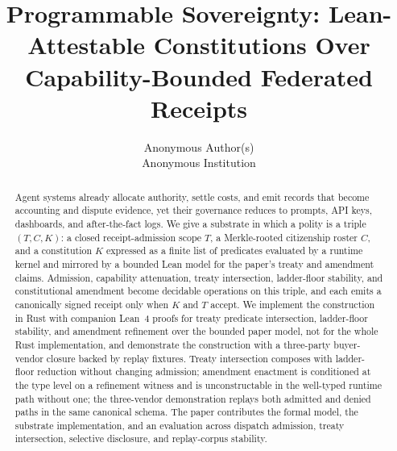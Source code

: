 \documentclass[letterpaper,twocolumn,10pt]{article}
\date{}
\title{\Large \bf Programmable Sovereignty: Lean-Attestable Constitutions Over Capability-Bounded Federated Receipts}
\author{
{\rm Anonymous Author(s)}\\
Anonymous Institution
}
\begin{document}
\maketitle

\begin{abstract}
Agent systems already allocate authority, settle costs, and emit records that become accounting and dispute evidence, yet their governance reduces to prompts, API keys, dashboards, and after-the-fact logs. We give a substrate in which a polity is a triple $(T, C, K)$: a closed receipt-admission scope $T$, a Merkle-rooted citizenship roster $C$, and a constitution $K$ expressed as a finite list of predicates evaluated by a runtime kernel and mirrored by a bounded Lean model for the paper's treaty and amendment claims. Admission, capability attenuation, treaty intersection, ladder-floor stability, and constitutional amendment become decidable operations on this triple, and each emits a canonically signed receipt only when $K$ and $T$ accept. We implement the construction in Rust with companion Lean~4 proofs for treaty predicate intersection, ladder-floor stability, and amendment refinement over the bounded paper model, not for the whole Rust implementation, and demonstrate the construction with a three-party buyer-vendor closure backed by replay fixtures. Treaty intersection composes with ladder-floor reduction without changing admission; amendment enactment is conditioned at the type level on a refinement witness and is unconstructable in the well-typed runtime path without one; the three-vendor demonstration replays both admitted and denied paths in the same canonical schema. The paper contributes the formal model, the substrate implementation, and an evaluation across dispatch admission, treaty intersection, selective disclosure, and replay-corpus stability.
\end{abstract}












\appendix





\end{document}
